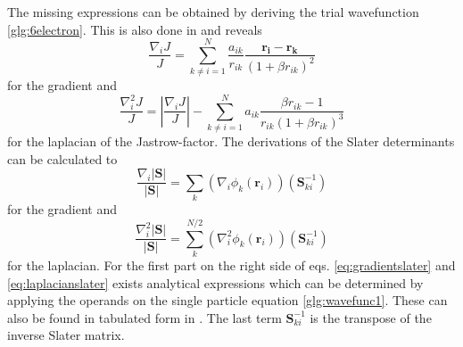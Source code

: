 The missing expressions can be obtained by deriving the trial wavefunction \ref{glg:6electron}. This is also done in \citet{hogberget2013} and reveals 
\begin{equation}\label{eq:jastrow-derivations}
    \frac{\nabla_i J}{J} = \sum_{k\neq i = 1}^{N}\frac{a_{ik}}{r_{ik}} \frac{\mathbf{r_i}-\mathbf{r_k}}{\left(1 + \beta r_{ik} \right)^2}
\end{equation}
for the gradient and 
\begin{equation}
    \frac{\nabla_i^2 J}{J} = \left| \frac{\nabla_i J}{J} \right| - \sum_{k\neq i = 1}^{N}a_{ik} \frac{\beta r_{ik} - 1}{r_{ik}\left(1 +\beta r_{ik} \right)^3} 
\end{equation}
for the laplacian of the Jastrow-factor. The derivations of the Slater determinants can be calculated to
\begin{equation}\label{eq:gradientslater}
    \frac{\nabla_i |\mathbf{S}|}{|\mathbf{S}|} = \sum_k \left( \nabla_i \phi_k(\mathbf{r}_i)\right)(\mathbf{S}_{ki}^{-1})
\end{equation}
for the gradient and
\begin{equation}\label{eq:laplacianslater}
    \frac{\nabla_i^2 |\mathbf{S}|}{|\mathbf{S}|} = \sum_k^{N/2} \left( \nabla_i^2 \phi_k(\mathbf{r}_i)\right)(\mathbf{S}_{ki}^{-1})
\end{equation}
for the laplacian. For the first part on the right side of eqs. \ref{eq:gradientslater} and \ref{eq:laplacianslater} exists analytical expressions which can be determined by applying the operands on the single particle equation \ref{glg:wavefunc1}. These can also be found in tabulated form in \citet[app. D]{hogberget2013}. The last term $\mathbf{S}_{ki}^{-1}$ is the transpose of the inverse Slater matrix. 